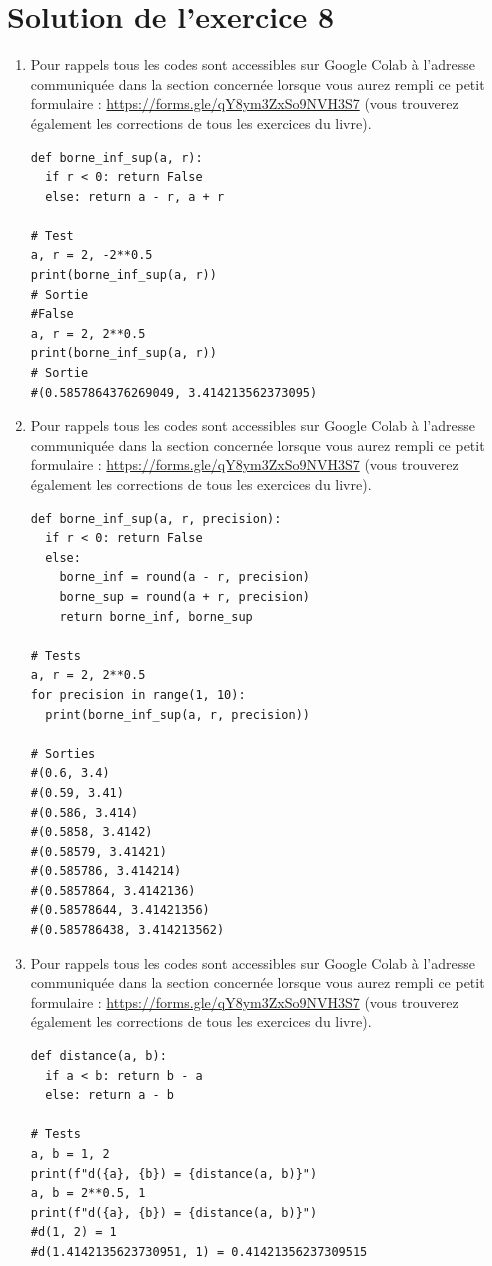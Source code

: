 \documentclass[a4paper,11pt]{book}
\begin{document}
\clearpage

\section{Solution de l'exercice 8}
\label{sec:org96d2399}
\label{org01182cf}
\label{page:sec8.4.2sol8}




\begin{enumerate}
\item Pour rappels tous les codes sont accessibles sur Google Colab à
l'adresse communiquée dans la section concernée lorsque vous aurez
rempli ce petit formulaire : \url{https://forms.gle/qY8ym3ZxSo9NVH3S7}
(vous trouverez également les corrections de tous les exercices du
livre).

\begin{verbatim}
def borne_inf_sup(a, r):
  if r < 0: return False
  else: return a - r, a + r

# Test
a, r = 2, -2**0.5
print(borne_inf_sup(a, r))
# Sortie
#False
a, r = 2, 2**0.5
print(borne_inf_sup(a, r))
# Sortie
#(0.5857864376269049, 3.414213562373095)
\end{verbatim}
\item Pour rappels tous les codes sont accessibles sur Google Colab à
l'adresse communiquée dans la section concernée lorsque vous aurez
rempli ce petit formulaire : \url{https://forms.gle/qY8ym3ZxSo9NVH3S7}
(vous trouverez également les corrections de tous les exercices du
livre).
\begin{verbatim}
def borne_inf_sup(a, r, precision):
  if r < 0: return False
  else:
    borne_inf = round(a - r, precision)
    borne_sup = round(a + r, precision)
    return borne_inf, borne_sup

# Tests
a, r = 2, 2**0.5
for precision in range(1, 10):
  print(borne_inf_sup(a, r, precision))

# Sorties
#(0.6, 3.4)
#(0.59, 3.41)
#(0.586, 3.414)
#(0.5858, 3.4142)
#(0.58579, 3.41421)
#(0.585786, 3.414214)
#(0.5857864, 3.4142136)
#(0.58578644, 3.41421356)
#(0.585786438, 3.414213562)
\end{verbatim}
\item Pour rappels tous les codes sont accessibles sur Google Colab à
l'adresse communiquée dans la section concernée lorsque vous aurez
rempli ce petit formulaire : \url{https://forms.gle/qY8ym3ZxSo9NVH3S7}
(vous trouverez également les corrections de tous les exercices du
livre).
\begin{verbatim}
def distance(a, b):
  if a < b: return b - a
  else: return a - b

# Tests
a, b = 1, 2
print(f"d({a}, {b}) = {distance(a, b)}")
a, b = 2**0.5, 1
print(f"d({a}, {b}) = {distance(a, b)}")
#d(1, 2) = 1
#d(1.4142135623730951, 1) = 0.41421356237309515
\end{verbatim}
\end{enumerate}
\end{document}
